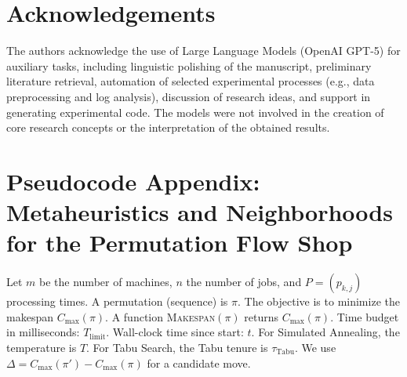 \documentclass[runningheads]{llncs}
\newcommand{\makespan}{C_{\max}}
\newcommand{\perm}{\pi}
\begin{document}
\section*{Acknowledgements}
The authors acknowledge the use of Large Language Models (OpenAI GPT-5) for auxiliary tasks, including linguistic polishing of the manuscript, preliminary literature retrieval, automation of selected experimental processes (e.g., data preprocessing and log analysis), discussion of research ideas, and support in generating experimental code. The models were not involved in the creation of core research concepts or the interpretation of the obtained results.


\appendix

\section{Pseudocode Appendix: Metaheuristics and Neighborhoods for the Permutation Flow Shop}
Let $m$ be the number of machines, $n$ the number of jobs, and $P = (p_{k,j})$ processing times. A permutation (sequence) is $\perm$. The objective is to minimize the makespan $\makespan(\perm)$. A function \textsc{Makespan}$(\perm)$ returns $\makespan(\perm)$. Time budget in milliseconds: $T_{\text{limit}}$. Wall-clock time since start: $t$. For Simulated Annealing, the temperature is $T$. For Tabu Search, the Tabu tenure is $\tau_{\text{Tabu}}$. We use $\Delta = \makespan(\perm')-\makespan(\perm)$ for a candidate move.
\end{document}
